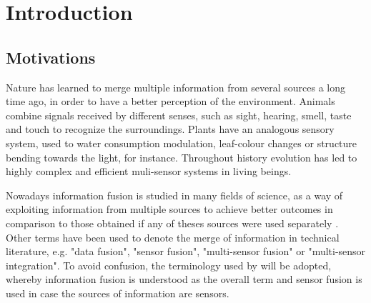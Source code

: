 

\tableofcontents*
\cleardoublepage



\textual

% 
%
%
\chapter{Introduction}


\section{Motivations}

Nature has learned to merge multiple information from several sources a long time ago, in order to have a better perception of the environment. Animals combine signals received by different senses, such as sight, hearing, smell, taste and touch to recognize the surroundings. Plants have an analogous sensory system, used to water consumption modulation, leaf-colour changes or structure bending towards the light, for instance. Throughout history evolution has led to highly complex and efficient muli-sensor systems in living beings. 

Nowadays information fusion is studied in many fields of science, as a way of exploiting information from multiple sources to achieve better outcomes in comparison to those obtained if any of theses sources were used separately \cite{Dasarathy2001}. Other terms have been used to denote the merge of information in technical literature, e.g. "data fusion", "sensor fusion", "multi-sensor fusion" or "multi-sensor integration". To avoid confusion, the terminology used by \cite{Elmenreich2002} will be adopted, whereby information fusion is understood as the overall term and sensor fusion is used in case the sources of information are sensors. 

